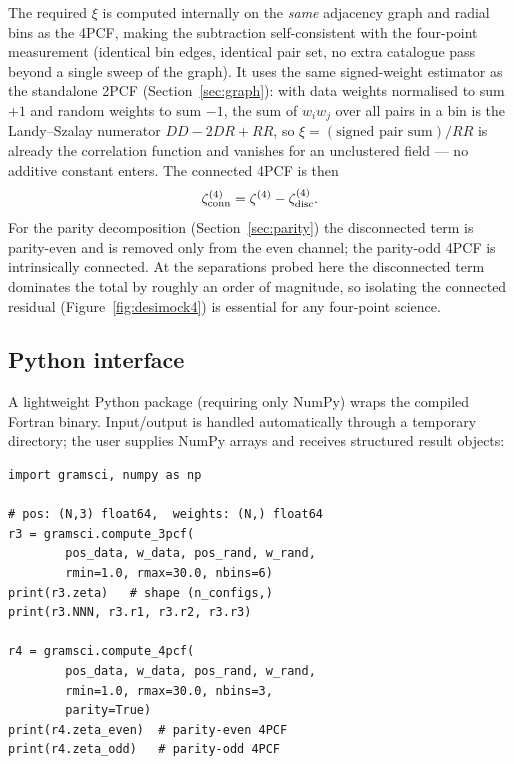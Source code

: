 \documentclass[twocolumn]{aastex701}
\begin{document}
The required $\xi$ is computed internally on the \emph{same} adjacency
graph and radial bins as the 4PCF, making the subtraction self-consistent
with the four-point measurement (identical bin edges, identical pair set,
no extra catalogue pass beyond a single sweep of the graph).  It uses the
same signed-weight estimator as the standalone 2PCF
(Section~\ref{sec:graph}): with data weights normalised to sum $+1$ and
random weights to sum $-1$, the sum of $w_i w_j$ over all pairs in a bin
is the Landy--Szalay numerator $DD - 2DR + RR$, so
$\xi = (\text{signed pair sum})/RR$ is already the correlation function
and vanishes for an unclustered field --- no additive constant enters.
The connected 4PCF is then
\begin{equation}
  \zeta^{(4)}_{\rm conn} = \zeta^{(4)} - \zeta^{(4)}_{\rm disc}.
  \label{eq:conn}
\end{equation}
For the parity decomposition (Section~\ref{sec:parity}) the disconnected
term is parity-even and is removed only from the even channel; the
parity-odd 4PCF is intrinsically connected.  At the separations probed
here the disconnected term dominates the total by roughly an order of
magnitude, so isolating the connected residual
(Figure~\ref{fig:desimock4}) is essential for any four-point science.

\subsection{Python interface}
\label{sec:python}

A lightweight Python package (requiring only NumPy) wraps the compiled
Fortran binary.  Input/output is handled automatically through a temporary
directory; the user supplies NumPy arrays and receives structured result
objects:

\begin{lstlisting}[caption={Minimal Python usage.},label=lst:python]
import gramsci, numpy as np

# pos: (N,3) float64,  weights: (N,) float64
r3 = gramsci.compute_3pcf(
        pos_data, w_data, pos_rand, w_rand,
        rmin=1.0, rmax=30.0, nbins=6)
print(r3.zeta)   # shape (n_configs,)
print(r3.NNN, r3.r1, r3.r2, r3.r3)

r4 = gramsci.compute_4pcf(
        pos_data, w_data, pos_rand, w_rand,
        rmin=1.0, rmax=30.0, nbins=3,
        parity=True)
print(r4.zeta_even)  # parity-even 4PCF
print(r4.zeta_odd)   # parity-odd 4PCF
\end{lstlisting}
\end{document}
